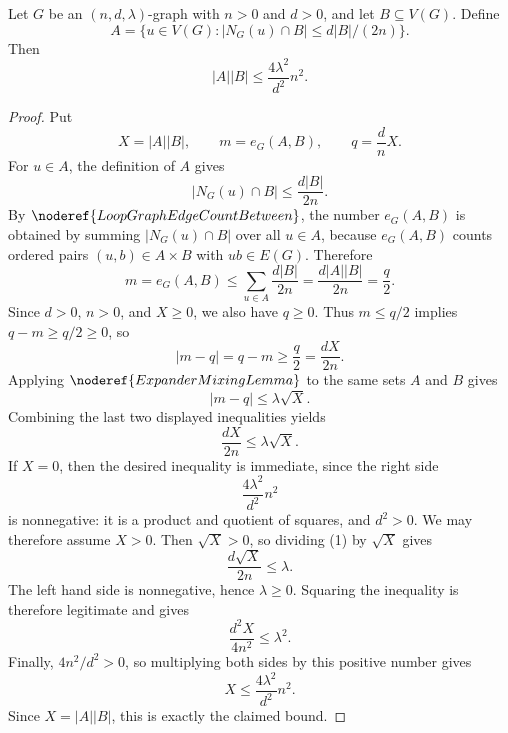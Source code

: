 \begin{lemma}
Let \(G\) be an \((n,d,\lambda)\)-graph with \(n>0\) and \(d>0\), and let \(B\subseteq V(G)\). Define
\[
  A=\{u\in V(G): |N_G(u)\cap B|\le d|B|/(2n)\}.
\]
Then
\[
  |A||B|\le \frac{4\lambda^2}{d^2}n^2.
\]
\end{lemma}
\begin{proof}
Put
\[
  X=|A||B|,\qquad m=e_G(A,B),\qquad q=\frac d n X.
\]
For \(u\in A\), the definition of \(A\) gives
\[
  |N_G(u)\cap B|\le \frac{d|B|}{2n}.
\]
By \(\noderef{LoopGraphEdgeCountBetween}\), the number \(e_G(A,B)\) is obtained by summing \(|N_G(u)\cap B|\) over all \(u\in A\), because \(e_G(A,B)\) counts ordered pairs \((u,b)\in A\times B\) with \(ub\in E(G)\). Therefore
\[
  m=e_G(A,B)
    \le \sum_{u\in A}\frac{d|B|}{2n}
    =\frac{d|A||B|}{2n}
    =\frac q2 .
\]
Since \(d>0\), \(n>0\), and \(X\ge 0\), we also have \(q\ge 0\). Thus \(m\le q/2\) implies \(q-m\ge q/2\ge 0\), so
\[
  |m-q|=q-m\ge \frac q2=\frac{dX}{2n}.
\]
Applying \(\noderef{ExpanderMixingLemma}\) to the same sets \(A\) and \(B\) gives
\[
  |m-q|\le \lambda\sqrt{X}.
\]
Combining the last two displayed inequalities yields
\[
  \frac{dX}{2n}\le \lambda\sqrt X. \tag{1}
\]
If \(X=0\), then the desired inequality is immediate, since the right side
\[
  \frac{4\lambda^2}{d^2}n^2
\]
is nonnegative: it is a product and quotient of squares, and \(d^2>0\). We may therefore assume \(X>0\). Then \(\sqrt X>0\), so dividing (1) by \(\sqrt X\) gives
\[
  \frac{d\sqrt X}{2n}\le \lambda .
\]
The left hand side is nonnegative, hence \(\lambda\ge 0\). Squaring the inequality is therefore legitimate and gives
\[
  \frac{d^2X}{4n^2}\le \lambda^2 .
\]
Finally, \(4n^2/d^2>0\), so multiplying both sides by this positive number gives
\[
  X\le \frac{4\lambda^2}{d^2}n^2.
\]
Since \(X=|A||B|\), this is exactly the claimed bound.
\end{proof}
